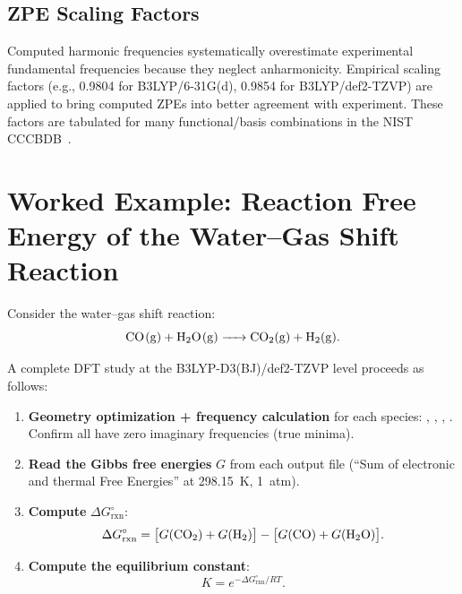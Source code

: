 \documentclass[11pt]{article}
\numberwithin{equation}{section}
\begin{document}
\subsection{ZPE Scaling Factors}

Computed harmonic frequencies systematically overestimate experimental fundamental frequencies because they neglect anharmonicity. Empirical scaling factors (e.g., 0.9804 for B3LYP/6-31G(d), 0.9854 for B3LYP/def2-TZVP) are applied to bring computed ZPEs into better agreement with experiment. These factors are tabulated for many functional/basis combinations in the NIST CCCBDB~\cite{CCCBDB}.


\section{Worked Example: Reaction Free Energy of the Water--Gas Shift Reaction}
\label{sec:worked}

Consider the water--gas shift reaction:
\begin{equation}
\ce{CO(g) + H2O(g) -> CO2(g) + H2(g)}.
\end{equation}

A complete DFT study at the B3LYP-D3(BJ)/def2-TZVP level proceeds as follows:

\begin{enumerate}
\item \textbf{Geometry optimization + frequency calculation} for each species: , , , . Confirm all have zero imaginary frequencies (true minima).

\item \textbf{Read the Gibbs free energies} $G$ from each output file (``Sum of electronic and thermal Free Energies'' at \SI{298.15}{K}, \SI{1}{atm}).

\item \textbf{Compute} $\Delta G^\circ_\text{rxn}$:
\begin{equation}
\Delta G^\circ_\text{rxn} = \bigl[G(\ce{CO2}) + G(\ce{H2})\bigr] - \bigl[G(\ce{CO}) + G(\ce{H2O})\bigr].
\end{equation}

\item \textbf{Compute the equilibrium constant}:
\begin{equation}
K = e^{-\Delta G^\circ_\text{rxn}/RT}.
\end{equation}
\end{enumerate}
\end{document}
